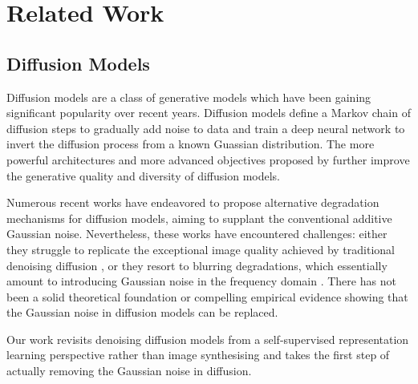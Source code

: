 \documentclass{article} \usepackage{iclr2024_conference,times}
\begin{document}
\section{Related Work}
\subsection{Diffusion Models}
Diffusion models \citep{DBLP:conf/icml/Sohl-DicksteinW15,DBLP:conf/nips/HoJA20} are a class of generative models which have been gaining significant popularity over recent years. Diffusion models define a Markov chain of diffusion steps to gradually add noise to data and train a deep neural network to invert the diffusion process from a known Guassian distribution. The more powerful architectures and more advanced objectives proposed by \citet{DBLP:conf/icml/NicholD21,DBLP:conf/nips/DhariwalN21} further improve the generative quality and diversity of diffusion models.

Numerous recent works  \citep{DBLP:conf/iclr/RissanenHS23,bansal2022cold,DBLP:conf/iclr/HoogeboomS23,daras2022soft} have endeavored to propose alternative degradation mechanisms for diffusion models, aiming to supplant the conventional additive Gaussian noise. Nevertheless, these works have encountered challenges: 
either they struggle to replicate the exceptional image quality achieved by traditional denoising diffusion \citep{bansal2022cold}, or they resort to blurring degradations, which essentially amount to introducing Gaussian noise in the frequency domain \citep{DBLP:conf/iclr/RissanenHS23,DBLP:conf/iclr/HoogeboomS23,daras2022soft}. There has not been a solid theoretical foundation or compelling empirical evidence showing that the Gaussian noise in diffusion models can be replaced. 

Our work revisits denoising diffusion models from a self-supervised representation learning perspective rather than image synthesising and takes the first step of actually removing the Gaussian noise in diffusion.
\end{document}
